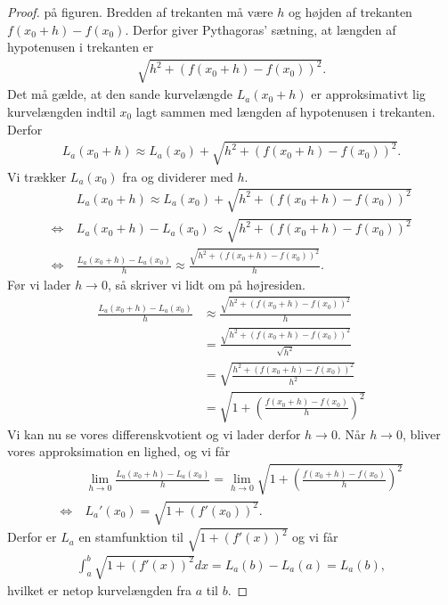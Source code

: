 \begin{proof}
	på figuren. Bredden af trekanten må være $h$ og højden af trekanten $f(x_0 + h) - f(x_0)$. Derfor giver 
	Pythagoras' sætning, at længden af hypotenusen i trekanten er
	\begin{align*}
		\sqrt{h^2 + \left(f(x_0 + h)- f(x_0)\right)^2}.
	\end{align*}
	Det må gælde, at den sande kurvelængde $L_a(x_0 + h)$ er approksimativt lig kurvelængden indtil $x_0$ lagt sammen 
	med længden af hypotenusen i trekanten. Derfor
	\begin{align*}
		L_a(x_0 + h) \approx L_a(x_0) + \sqrt{h^2 + \left(f(x_0 + h) - f(x_0)\right)^2}.
	\end{align*}
	Vi trækker $L_a(x_0)$ fra og dividerer med $h$.
	\begin{align*}
		&L_a(x_0 + h) \approx L_a(x_0) + \sqrt{h^2 + \left(f(x_0 + h) - f(x_0)\right)^2} \\
		\Leftrightarrow	\ &L_a(x_0 + h) - L_a(x_0) \approx  \sqrt{h^2 + \left(f(x_0 + h) - f(x_0)\right)^2} \\
		\Leftrightarrow	\ &\frac{L_a(x_0 + h) - L_a(x_0)}{h} \approx  
		 \frac{\sqrt{h^2 + \left(f(x_0 + h) - f(x_0)\right)^2}}{h}.
	\end{align*}
	Før vi lader $h \to 0$, så skriver vi lidt om på højresiden.
	\begin{align*}
		\frac{L_a(x_0 + h) - L_a(x_0)}{h} &\approx  \frac{\sqrt{h^2 + \left(f(x_0 + h) - f(x_0)\right)^2}}{h} \\
		&= \frac{\sqrt{h^2 + \left(f(x_0 + h) - f(x_0)\right)^2}}{\sqrt{h^2}} \\
		&= \sqrt{\frac{h^2 + \left(f(x_0 + h) - f(x_0)\right)^2}{h^2}} \\ 
		&= \sqrt{1 + \left(\frac{f(x_0 + h) - f(x_0)}{h}\right)^2}
	\end{align*}
	Vi kan nu se vores differenskvotient og vi lader derfor $h \to 0$. Når $h \to 0$, bliver vores approksimation en 
	lighed, og vi får
	\begin{align*}
		&\lim_{h \to 0}\frac{L_a(x_0 + h) - L_a(x_0)}{h} =
		 \lim_{h \to 0}\sqrt{1 + \left(\frac{f(x_0 + h) - f(x_0)}{h}\right)^2} \\
		 \Leftrightarrow \ &L_a'(x_0) = \sqrt{1+(f'(x_0))^2}.
	\end{align*}
	Derfor er $L_a$ en stamfunktion til $\sqrt{1+(f'(x))^2}$ og vi får
	\begin{align*}
		\int_a^b \sqrt{1+(f'(x))^2} dx = L_a(b) - L_a(a) = L_a(b),
	\end{align*}
	hvilket er netop kurvelængden fra $a$ til $b$. 
\end{proof}


